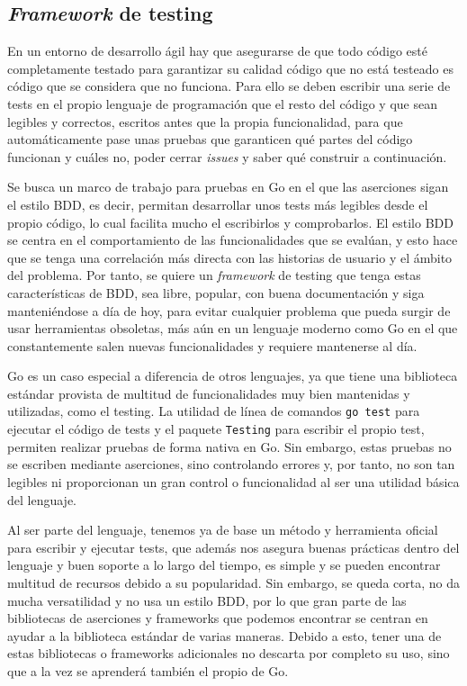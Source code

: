 \subsection{\textit{Framework} de testing} En un entorno de desarrollo ágil hay
que asegurarse de que todo código esté completamente testado para garantizar su
calidad código que no está testeado es código que se considera que no
funciona. Para ello se deben escribir una serie de tests en el propio lenguaje
de programación que el resto del código y que sean legibles y correctos,
escritos antes que la propia funcionalidad, para que automáticamente pase unas
pruebas que garanticen qué partes del código funcionan y cuáles no, poder cerrar
\textit{issues} y saber qué construir a continuación.

Se busca un marco de trabajo para pruebas en Go en el que las aserciones sigan
el estilo BDD, es decir, permitan desarrollar unos tests más legibles desde el
propio código, lo cual facilita mucho el escribirlos y comprobarlos. El estilo
BDD se centra en el comportamiento de las funcionalidades que se evalúan, y esto
hace que se tenga una correlación más directa con las historias de usuario y el
ámbito del problema. Por tanto, se quiere un \textit{framework} de testing que
tenga estas características de BDD, sea libre, popular, con buena documentación
y siga manteniéndose a día de hoy, para evitar cualquier problema que pueda
surgir de usar herramientas obsoletas, más aún en un lenguaje moderno como Go en
el que constantemente salen nuevas funcionalidades y requiere mantenerse al día.

Go es un caso especial a diferencia de otros lenguajes, ya que tiene una
biblioteca estándar provista de multitud de funcionalidades muy bien mantenidas
y utilizadas, como el testing. La utilidad de línea de comandos \texttt{go test}
para ejecutar el código de tests y el paquete \texttt{Testing} para escribir el
propio test, permiten realizar pruebas de forma nativa en Go. Sin embargo, estas
pruebas no se escriben mediante aserciones, sino controlando errores y, por
tanto, no son tan legibles ni proporcionan un gran control o funcionalidad al
ser una utilidad básica del lenguaje.

Al ser parte del lenguaje, tenemos ya de base un método y herramienta oficial
para escribir y ejecutar tests, que además nos asegura buenas prácticas dentro
del lenguaje y buen soporte a lo largo del tiempo, es simple y se pueden
encontrar multitud de recursos debido a su popularidad. Sin embargo, se queda
corta, no da mucha versatilidad y no usa un estilo BDD, por lo que gran parte de
las bibliotecas de aserciones y frameworks que podemos encontrar se centran en
ayudar a la biblioteca estándar de varias maneras. Debido a esto, tener una de
estas bibliotecas o frameworks adicionales no descarta por completo su uso, sino
que a la vez se aprenderá también el propio de Go.

